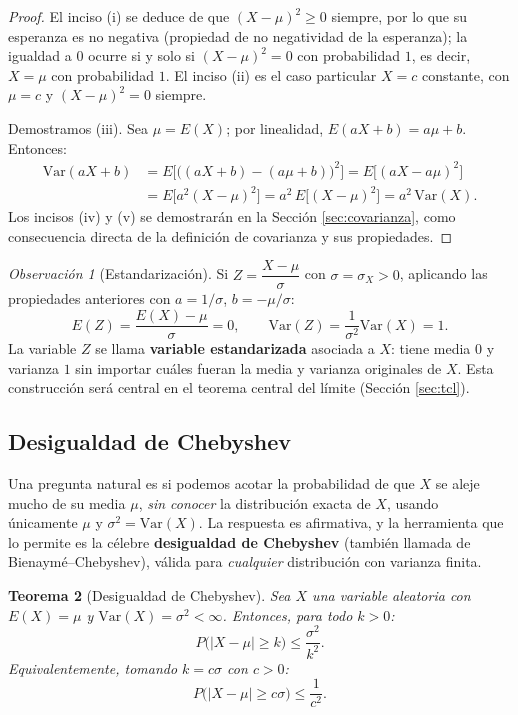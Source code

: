 \documentclass[11pt,a4paper]{article}
\theoremstyle{plain}
\newtheorem{teorema}{Teorema}[section]
\theoremstyle{definition}
\theoremstyle{remark}
\newtheorem{observacion}[teorema]{Observación}
\begin{document}
\begin{proof}
El inciso (i) se deduce de que $(X-\mu)^2\geq 0$ siempre, por lo que su esperanza es no negativa (propiedad de no negatividad de la esperanza); la igualdad a $0$ ocurre si y solo si $(X-\mu)^2=0$ con probabilidad $1$, es decir, $X=\mu$ con probabilidad $1$. El inciso (ii) es el caso particular $X=c$ constante, con $\mu=c$ y $(X-\mu)^2=0$ siempre.

Demostramos (iii). Sea $\mu=E(X)$; por linealidad, $E(aX+b)=a\mu+b$. Entonces:
\begin{align*}
\text{Var}(aX+b) &= E\Big[\big((aX+b)-(a\mu+b)\big)^2\Big] = E\big[(aX-a\mu)^2\big] \\
&= E\big[a^2(X-\mu)^2\big] = a^2\, E\big[(X-\mu)^2\big] = a^2\,\text{Var}(X).
\end{align*}
Los incisos (iv) y (v) se demostrarán en la Sección \ref{sec:covarianza}, como consecuencia directa de la definición de covarianza y sus propiedades.
\end{proof}

\begin{observacion}[Estandarización]
Si $Z=\dfrac{X-\mu}{\sigma}$ con $\sigma=\sigma_X>0$, aplicando las propiedades anteriores con $a=1/\sigma$, $b=-\mu/\sigma$:
\[
E(Z) = \frac{E(X)-\mu}{\sigma} = 0, \qquad \text{Var}(Z) = \frac{1}{\sigma^2}\text{Var}(X) = 1.
\]
La variable $Z$ se llama \textbf{variable estandarizada} asociada a $X$: tiene media $0$ y varianza $1$ sin importar cuáles fueran la media y varianza originales de $X$. Esta construcción será central en el teorema central del límite (Sección \ref{sec:tcl}).
\end{observacion}

\subsection{Desigualdad de Chebyshev}

Una pregunta natural es si podemos acotar la probabilidad de que $X$ se aleje mucho de su media $\mu$, \emph{sin conocer} la distribución exacta de $X$, usando únicamente $\mu$ y $\sigma^2=\text{Var}(X)$. La respuesta es afirmativa, y la herramienta que lo permite es la célebre \textbf{desigualdad de Chebyshev} (también llamada de Bienaymé--Chebyshev), válida para \emph{cualquier} distribución con varianza finita.

\begin{teorema}[Desigualdad de Chebyshev]
Sea $X$ una variable aleatoria con $E(X)=\mu$ y $\text{Var}(X)=\sigma^2<\infty$. Entonces, para todo $k>0$:
\[
P\big(|X-\mu|\geq k\big) \leq \frac{\sigma^2}{k^2}.
\]
Equivalentemente, tomando $k=c\sigma$ con $c>0$:
\[
P\big(|X-\mu|\geq c\sigma\big) \leq \frac{1}{c^2}.
\]
\end{teorema}
\end{document}
